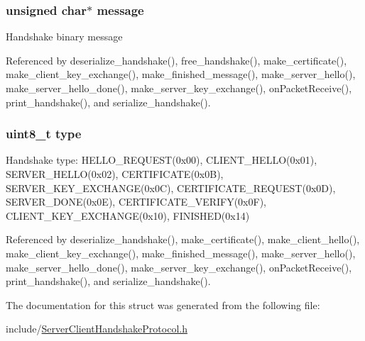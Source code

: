 \subsubsection[{\texorpdfstring{message}{message}}]{\setlength{\rightskip}{0pt plus 5cm}unsigned char$\ast$ message}\hypertarget{structhandshake__t_abb13456032cf48eaa794391b6ed937c7}{}\label{structhandshake__t_abb13456032cf48eaa794391b6ed937c7}
Handshake binary message 

Referenced by deserialize\+\_\+handshake(), free\+\_\+handshake(), make\+\_\+certificate(), make\+\_\+client\+\_\+key\+\_\+exchange(), make\+\_\+finished\+\_\+message(), make\+\_\+server\+\_\+hello(), make\+\_\+server\+\_\+hello\+\_\+done(), make\+\_\+server\+\_\+key\+\_\+exchange(), on\+Packet\+Receive(), print\+\_\+handshake(), and serialize\+\_\+handshake().

\subsubsection[{\texorpdfstring{type}{type}}]{\setlength{\rightskip}{0pt plus 5cm}uint8\+\_\+t type}\hypertarget{structhandshake__t_a1d127017fb298b889f4ba24752d08b8e}{}\label{structhandshake__t_a1d127017fb298b889f4ba24752d08b8e}
Handshake type\+: H\+E\+L\+L\+O\+\_\+\+R\+E\+Q\+U\+E\+S\+T(0x00), C\+L\+I\+E\+N\+T\+\_\+\+H\+E\+L\+L\+O(0x01), S\+E\+R\+V\+E\+R\+\_\+\+H\+E\+L\+L\+O(0x02), C\+E\+R\+T\+I\+F\+I\+C\+A\+T\+E(0x0\+B), S\+E\+R\+V\+E\+R\+\_\+\+K\+E\+Y\+\_\+\+E\+X\+C\+H\+A\+N\+G\+E(0x0\+C), C\+E\+R\+T\+I\+F\+I\+C\+A\+T\+E\+\_\+\+R\+E\+Q\+U\+E\+S\+T(0x0\+D), S\+E\+R\+V\+E\+R\+\_\+\+D\+O\+N\+E(0x0\+E), C\+E\+R\+T\+I\+F\+I\+C\+A\+T\+E\+\_\+\+V\+E\+R\+I\+F\+Y(0x0\+F), C\+L\+I\+E\+N\+T\+\_\+\+K\+E\+Y\+\_\+\+E\+X\+C\+H\+A\+N\+G\+E(0x10), F\+I\+N\+I\+S\+H\+E\+D(0x14) 

Referenced by deserialize\+\_\+handshake(), make\+\_\+certificate(), make\+\_\+client\+\_\+hello(), make\+\_\+client\+\_\+key\+\_\+exchange(), make\+\_\+finished\+\_\+message(), make\+\_\+server\+\_\+hello(), make\+\_\+server\+\_\+hello\+\_\+done(), make\+\_\+server\+\_\+key\+\_\+exchange(), on\+Packet\+Receive(), print\+\_\+handshake(), and serialize\+\_\+handshake().



The documentation for this struct was generated from the following file\+:\begin{DoxyCompactItemize}
\item 
include/\hyperlink{_server_client_handshake_protocol_8h}{Server\+Client\+Handshake\+Protocol.\+h}\end{DoxyCompactItemize}
